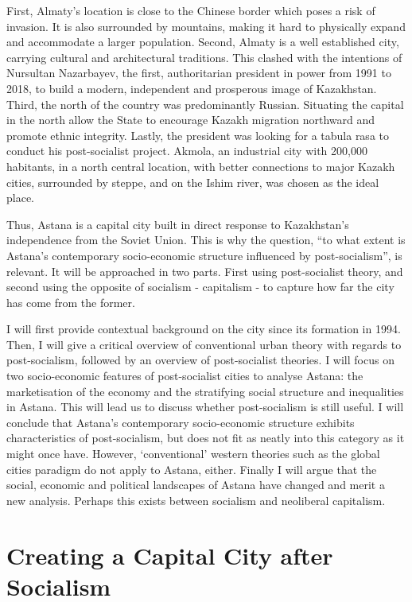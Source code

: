 \documentclass{article}
\begin{document}
First, Almaty's location is close to the Chinese border which poses a risk of invasion. It is also surrounded by mountains, making it hard to physically expand and accommodate a larger population. 
Second, Almaty is a well established city, carrying cultural and architectural traditions. This clashed with the intentions of Nursultan Nazarbayev, the first, authoritarian president in power from 1991 to 2018, to build a modern, independent and prosperous image of Kazakhstan. 
Third, the north of the country was predominantly Russian. Situating the capital in the north allow the State to encourage Kazakh migration northward and promote ethnic integrity.
 Lastly, the president was looking for a tabula rasa to conduct his post-socialist project. Akmola, an industrial city with 200,000 habitants, in a north central location, with better connections to major Kazakh cities, surrounded by steppe, and on the Ishim river, was chosen as the ideal place.

Thus, Astana is a capital city built in direct response to Kazakhstan's independence from the Soviet Union. This is why the question, “to what extent is Astana's contemporary socio-economic structure influenced by post-socialism”, is relevant. It will be approached in two parts. First using post-socialist theory, and second using the opposite of socialism - capitalism - to capture how far the city has come from the former.

I will first provide contextual background on the city since its formation in 1994. Then, I will give a critical overview of conventional urban theory with regards to post-socialism, followed by an overview of post-socialist theories. I will focus on two socio-economic features of post-socialist cities to analyse Astana: the marketisation of the economy and the stratifying social structure and inequalities in Astana.
This will lead us to discuss whether post-socialism is still useful. I will conclude that Astana's contemporary socio-economic structure exhibits characteristics of post-socialism, but does not fit as neatly into this category as it might once have. 
However, `conventional' western theories such as the global cities paradigm do not apply to Astana, either. 
Finally I will argue that the social, economic and political landscapes of Astana have changed and merit a new analysis. Perhaps this exists between socialism and neoliberal capitalism.

\section{Creating a Capital City after Socialism}
\end{document}

